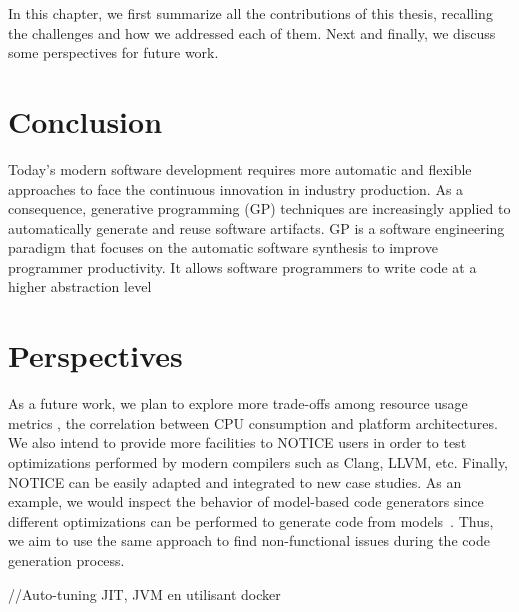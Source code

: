 In this chapter, we first summarize all the contributions of this thesis, recalling the challenges and how we addressed each of them. Next and finally, we discuss some perspectives for future work.

\section{Conclusion}
Today's modern software development requires more automatic and flexible approaches to face the continuous innovation in industry production.
As a consequence, generative programming (GP) techniques are increasingly applied to automatically generate and reuse software artifacts.
GP is a software engineering paradigm that focuses on the automatic software synthesis to improve programmer productivity. It allows software programmers to write code at a higher abstraction level 
 



\section{Perspectives}
As a future work, we plan to explore more trade-offs among resource usage metrics \eg, the correlation between CPU consumption and platform architectures. 
We also intend to provide more facilities to NOTICE users in order to test optimizations performed by modern compilers such as Clang, LLVM, etc.
Finally, NOTICE can be easily adapted and integrated to new case studies. As an example, we would inspect the behavior of model-based code generators since different optimizations can be performed to generate code from models~\cite{stuermer2007systematic}. Thus, we aim to use the same approach to find non-functional issues during the code generation process.

//Auto-tuning JIT, JVM en utilisant docker
